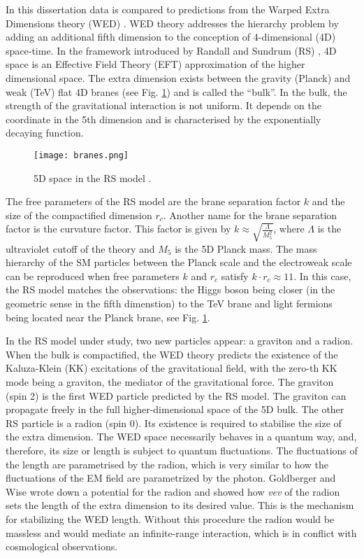 In this dissertation data is compared to predictions from the Warped Extra Dimensions theory (WED) \cite{Oliveira:2014kla}. WED theory addresses the hierarchy problem by adding an additional fifth dimension to the conception of 4-dimensional (4D) space-time. In the framework introduced by Randall and Sundrum (RS) \cite{Randall:1999ee}, 4D space is an Effective Field Theory (EFT) approximation of the higher dimensional space. The extra dimension exists between the gravity (Planck) and weak (TeV) flat 4D branes (see Fig. \ref{branes}) and is called the ``bulk''. In the bulk, the strength of the gravitational interaction is not uniform. It depends on the coordinate in the 5th dimension and is characterised by the exponentially decaying function.




\begin{figure}[H]
\centering
\texttt{[image: branes.png]}
\caption[RS branes]{5D space in the RS model \cite{Xanda}.}
\label{branes}
\end{figure}




The free parameters of the RS model are the brane separation factor $k$ and the size of the compactified dimension $r_c$. Another name for the brane separation factor is the curvature factor. This factor is given by $k \approx \sqrt{ \frac{\Lambda}{M^2_5}  }$, where $\Lambda$ is the ultraviolet cutoff of the theory and $M_5$ is the 5D Planck mass. %
The mass hierarchy of the SM particles between the Planck scale and the electroweak scale can be reproduced when free parameters $k$ and $r_c$ satisfy $k \cdot r_c \approx 11$. In this case, the RS model matches the observations: the Higgs boson being closer (in the geometric sense in the fifth dimenstion) to the TeV brane and light fermions being located near the Planck brane, see Fig. \ref{branes}.

In the RS model under study, two new particles appear: a graviton and a radion. When the bulk is compactified, the WED theory predicts the existence of the Kaluza-Klein (KK) \cite{Uzawa:1999pg} excitations of the gravitational field, with the zero-th KK mode being a graviton, the mediator of the gravitational force. The graviton (spin 2) is the first WED particle predicted by the RS model. The graviton can propagate freely in the full higher-dimensional space of the 5D bulk. The other RS particle is a radion (spin 0). Its existence is required to stabilise the size of the extra dimension. The WED space necessarily behaves in a quantum way, and, therefore, its size or length is subject to quantum fluctuations. The fluctuations of the length are parametrised by the radion, which is very similar to how the fluctuations of the EM field are parametrized by the photon. Goldberger and Wise \cite{Goldberger:1999uk} wrote down a potential for the radion and showed how \textit{vev} of the radion sets the length of the extra dimension to its desired value. This is the mechanism for stabilizing the WED length. Without this procedure the radion would be massless and would mediate an infinite-range interaction, which is in conflict with cosmological observations. 


